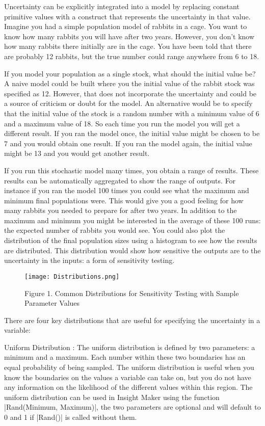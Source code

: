 \documentclass[]{memoir}
\makeatletter
\newcommand{\FunctionTok}[1]{\textcolor[rgb]{0.02,0.16,0.49}{{#1}}}
\newcommand{\NormalTok}[1]{{#1}}
\def\maxwidth{\ifdim\Gin@nat@width>\linewidth\linewidth
\else\Gin@nat@width\fi}
\let\Oldincludegraphics\includegraphics
\renewcommand{\includegraphics}[1]{\Oldincludegraphics[width=\maxwidth]{#1}}
\makeatother
\begin{document}
Uncertainty can be explicitly integrated into a model by replacing
constant primitive values with a construct that represents the
uncertainty in that value. Imagine you had a simple population model of
rabbits in a cage. You want to know how many rabbits you will have after
two years. However, you don't know how many rabbits there initially are
in the cage. You have been told that there are probably 12 rabbits, but
the true number could range anywhere from 6 to 18.

If you model your population as a single stock, what should the initial
value be? A naive model could be built where you the initial value of
the rabbit stock was specified as 12. However, that does not incorporate
the uncertainty and could be a source of criticism or doubt for the
model. An alternative would be to specify that the initial value of the
stock is a random number with a minimum value of 6 and a maximum value
of 18. So each time you run the model you will get a different result.
If you ran the model once, the initial value might be chosen to be 7 and
you would obtain one result. If you ran the model again, the initial
value might be 13 and you would get another result.

If you run this stochastic model many times, you obtain a range of
results. These results can be automatically aggregated to show the range
of outputs. For instance if you ran the model 100 times you could see
what the maximum and minimum final populations were. This would give you
a good feeling for how many rabbits you needed to prepare for after two
years. In addition to the maximum and minimum you might be interested in
the average of these 100 runs: the expected number of rabbits you would
see. You could also plot the distribution of the final population sizes
using a histogram to see how the results are distributed. This
distribution would show how sensitive the outputs are to the uncertainty
in the inputs: a form of sensitivity testing.

\begin{figure}[htbp]
\centering
\texttt{[image: Distributions.png]}
\caption{Figure 1. Common Distributions for Sensitivity Testing with
Sample Parameter Values}
\end{figure}

There are four key distributions that are useful for specifying the
uncertainty in a variable:

Uniform Distribution : The uniform distribution is defined by two
parameters: a minimum and a maximum. Each number within these two
boundaries has an equal probability of being sampled. The uniform
distribution is useful when you know the boundaries on the values a
variable can take on, but you do not have any information on the
likelihood of the different values within this region. The uniform
distribution can be used in Insight Maker using the function
|\FunctionTok{Rand}\NormalTok{(Minimum, Maximum)}|, the two parameters
are optional and will default to 0 and 1 if
|\FunctionTok{Rand}\NormalTok{()}| is called without them.
\end{document}
